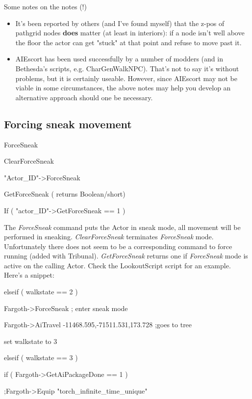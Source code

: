 \documentclass[
]{article}
\begin{document}
Some notes on the notes (!)

\begin{itemize}
\item
  It's been reported by others (and I've found myself) that the z-pos of
  pathgrid nodes \textbf{does} matter (at least in interiors): if a node
  isn't well above the floor the actor can get "stuck" at that point and
  refuse to move past it.
\item
  AIEscort has been used successfully by a number of modders (and in
  Bethesda's scripts, e.g. CharGenWalkNPC). That's not to say it's
  without problems, but it is certainly useable. However, since AIEscort
  may not be viable in some circumstances, the above notes may help you
  develop an alternative approach should one be necessary.
\end{itemize}

\hypertarget{forcing-sneak-movement}{%
\subsection{Forcing sneak movement}\label{forcing-sneak-movement}}

ForceSneak

ClearForceSneak

"Actor\_ID"-\textgreater ForceSneak

GetForceSneak ( returns Boolean/short)

If ( "actor\_ID"-\textgreater GetForceSneak == 1 )

The \emph{ForceSneak} command puts the Actor in sneak mode, all movement
will be performed in sneaking. \emph{ClearForceSneak} terminates
\emph{ForceSneak} mode. Unfortunately there does not seem to be a
corresponding command to force running (added with Tribunal).
\emph{GetForceSneak} returns one if \emph{ForceSneak} mode is active on
the calling Actor. Check the LookoutScript script for an example. Here's
a snippet:

elseif ( walkstate == 2 )

Fargoth-\textgreater ForceSneak ; enter sneak mode

Fargoth-\textgreater AiTravel -11468.595,-71511.531,173.728 ;goes to
tree

set walkstate to 3

elseif ( walkstate == 3 )

if ( Fargoth-\textgreater GetAiPackageDone == 1 )

;Fargoth-\textgreater Equip "torch\_infinite\_time\_unique"
\end{document}
